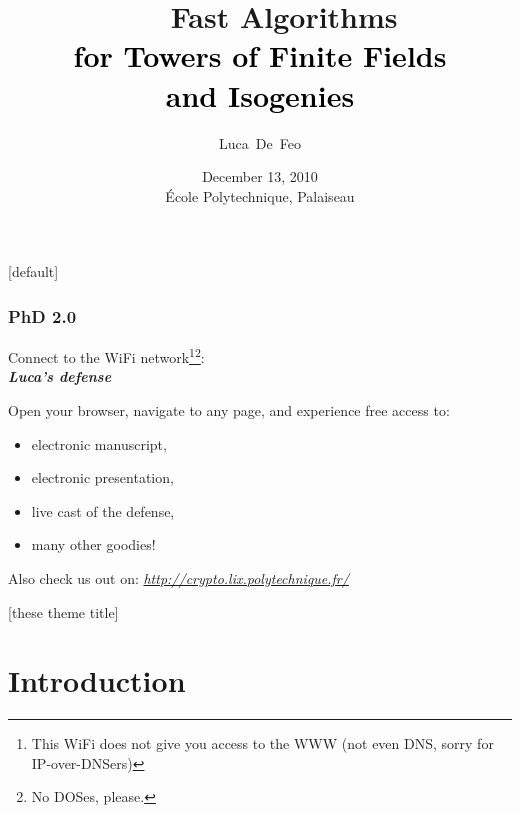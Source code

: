 \documentclass[10pt,usepdftitle=false]{beamer}
\title[Fast Algorithms for Towers of Finite Fields and Isogenies]{
  \def\svgwidth{2.63ex}
  \def\exclfont{\scriptsize\rmfamily}
  ~~~Fast Algorithms\\
  \normalsize\textcolor{black}{for Towers of Finite Fields\\and Isogenies}}
\author{Luca~De~Feo}
\institute[LIX \& INRIA Saclay]{LIX, École Polytechnique \& INRIA Saclay, Projet TANC}
\date[December 13, 2010]{December 13, 2010\\École Polytechnique, Palaiseau}
\begin{document}
{[default]
\begin{frame}
  \frametitle{PhD 2.0}
  
  \begin{center}
    \Large Connect to the WiFi network\footnote{This WiFi does not
      give you access to the WWW (not even DNS, sorry for
      IP-over-DNSers)}\footnote{No
      DOSes, please.}:\\
    \emph{\textbf{Luca's defense}} \end{center}

  \bigskip

  Open your browser, navigate to any page, and experience free
  access to:
  \begin{itemize}
  \item electronic manuscript,
  \item electronic presentation, %
  \item live cast of the defense,
  \item many other goodies!
  \end{itemize}

  \bigskip

  Also check us out on: \emph{\url{http://crypto.lix.polytechnique.fr/}}
\end{frame}
}


{[these theme title]
\begin{frame}
  \titlepage
\end{frame}
}


\setcounter{framenumber}{0}
\section{Introduction}
\end{document}
